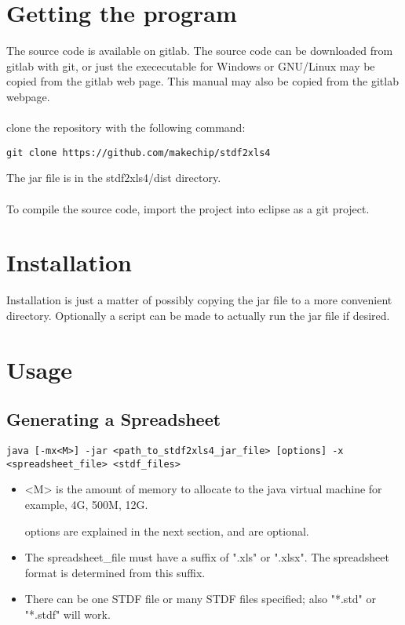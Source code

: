 \documentclass[letterpaper]{article}
\begin{document}
\section{Getting the program}

The source code is available on gitlab. The source code can be downloaded
from gitlab with git, or just the exececutable for Windows or GNU/Linux
may be copied from the gitlab web page.  This manual may also be copied
from the gitlab webpage.\\
\\
clone the repository with the following command:
\begin{verbatim}
git clone https://github.com/makechip/stdf2xls4
\end{verbatim}

The jar file is in the stdf2xls4/dist directory.\\
\\
To compile the source code, import the project into eclipse as a git project.

\section{Installation}

Installation is just a matter of possibly copying the jar file to a more convenient
directory.  Optionally a script can be made to actually run the jar file if desired.

\section{Usage}

\subsection{Generating a Spreadsheet}
\begin{verbatim}
java [-mx<M>] -jar <path_to_stdf2xls4_jar_file> [options] -x <spreadsheet_file> <stdf_files>
\end{verbatim}
\begin{itemize}
\item <M> is the amount of memory to allocate to the java virtual machine for example, 4G, 500M, 12G.
\item [options] are explained in the next section, and are optional.
\item The spreadsheet\_file must have a suffix of ".xls" or ".xlsx".  The spreadsheet format is
determined from this suffix.
\item There can be one STDF file or many STDF files specified; also "*.std" or "*.stdf" will work.
\end{itemize}
\end{document}
